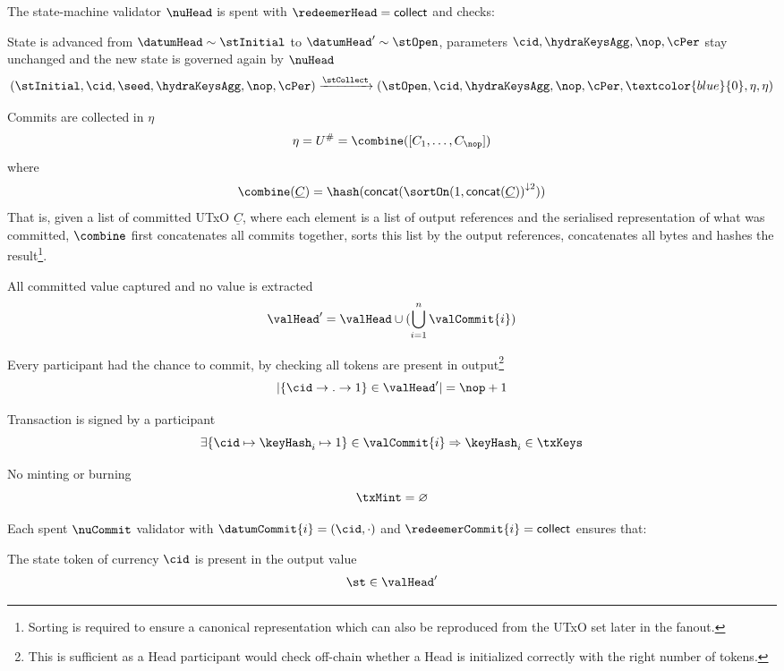 \noindent The state-machine validator $\nuHead$ is spent with
$\redeemerHead = \mathsf{collect}$ and checks:
\begin{menumerate}
	\item State is advanced from $\datumHead \sim \stInitial$ to
	$\datumHead' \sim \stOpen$, parameters $\cid,\hydraKeysAgg,\nop,\cPer$ stay
	unchanged and the new state is governed again by $\nuHead$
	\[
		(\stInitial,\cid,\seed,\hydraKeysAgg,\nop,\cPer) \xrightarrow{\stCollect} (\stOpen,\cid,\hydraKeysAgg,\nop,\cPer,\textcolor{blue}{0},\eta,\eta)
	\]
	\item Commits are collected in $\eta$
	\[
		\eta = U^{\#} = \combine([C_{1}, \dots, C_{\nop}])
	\]
	where
	\[
		\combine(\underline{C}) = \hash(\mathsf{concat}({\sortOn(1, \mathsf{concat}(\underline{C}))}^{\downarrow2}))
	\]
	That is, given a list of committed UTxO $\underline{C}$, where each element is
	a list of output references and the serialised representation of what was
	committed, $\combine$ first concatenates all commits together, sorts this list
	by the output references, concatenates all bytes and hashes the
	result\footnote{Sorting is required to ensure a canonical representation which
		can also be reproduced from the UTxO set later in the fanout.}.

	\item All committed value captured and no value is extracted
	\[
		\valHead' = \valHead \cup (\bigcup_{i=1}^{n} \valCommit{i})
	\]
	\item Every participant had the chance to commit, by checking all tokens are
	present in output\footnote{This is sufficient as a Head participant would
		check off-chain whether a Head is initialized correctly with the right
		number of tokens.}
	\[
		|\{\cid \rightarrow . \rightarrow 1\} \in \valHead'| = \nop + 1
	\]
	\item Transaction is signed by a participant
	\[
		\exists \{\cid \mapsto \keyHash_{i} \mapsto 1\} \in \valCommit{i} \Rightarrow \keyHash_{i} \in \txKeys
	\]
	\item No minting or burning
	\[
		\txMint = \varnothing
	\]
\end{menumerate}

\noindent Each spent $\nuCommit$ validator with $\datumCommit{i} = (\cid,\cdot)$ and $\redeemerCommit{i} = \mathsf{collect}$ ensures that:
\begin{menumerate}
	\item The state token of currency $\cid$ is present in the output value
	\[
		\st \in \valHead'
	\]
\end{menumerate}

